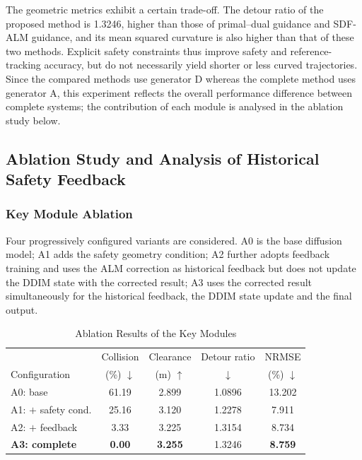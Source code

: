 \documentclass[journal]{IEEEtran}
\begin{document}
The geometric metrics exhibit a certain trade-off. The detour ratio of the
proposed method is 1.3246, higher than those of primal--dual guidance and
SDF-ALM guidance, and its mean squared curvature is also higher than that of
these two methods. Explicit safety constraints thus improve safety and
reference-tracking accuracy, but do not necessarily yield shorter or less curved
trajectories. Since the compared methods use generator D whereas the complete
method uses generator A, this experiment reflects the overall performance
difference between complete systems; the contribution of each module is analysed
in the ablation study below.

\subsection{Ablation Study and Analysis of Historical Safety Feedback}

\subsubsection{Key Module Ablation}
Four progressively configured variants are considered. A0 is the base diffusion
model; A1 adds the safety geometry condition; A2 further adopts feedback training
and uses the ALM correction as historical feedback but does not update the DDIM
state with the corrected result; A3 uses the corrected result simultaneously for
the historical feedback, the DDIM state update and the final output.

\begin{table}[!t]
\caption{Ablation Results of the Key Modules}
\label{tab:ablation}
\centering
\footnotesize
\setlength{\tabcolsep}{4pt}
\begin{tabular}{lcccc}
\hline
 & Collision & Clearance & Detour ratio & NRMSE \\
Configuration & (\%) $\downarrow$ & (m) $\uparrow$ &
$\downarrow$ & (\%) $\downarrow$ \\
\hline
A0: base     & 61.19 & 2.899 & 1.0896 & 13.202 \\
A1: $+$ safety cond. & 25.16 & 3.120 & 1.2278 &  7.911 \\
A2: $+$ feedback     &  3.33 & 3.225 & 1.3154 &  8.734 \\
\textbf{A3: complete} & \textbf{0.00} & \textbf{3.255} & 1.3246 &
\textbf{8.759} \\
\hline
\end{tabular}
\end{table}
\end{document}
